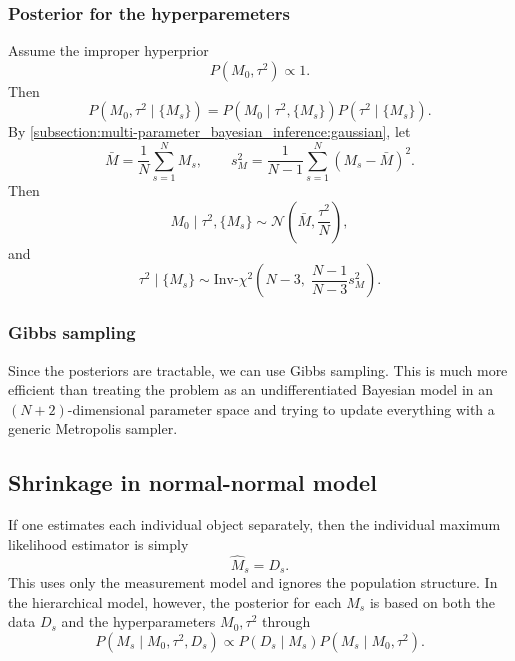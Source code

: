 \documentclass[11pt, titlepage]{article} %
\numberwithin{equation}{section}
\theoremstyle{definition}
\numberwithin{assumption}{section}
\begin{document}
\subsubsection*{Posterior for the hyperparemeters}

Assume the improper hyperprior
\begin{equation*}
    P(M_0,\tau^2)\propto 1.
\end{equation*}
Then
\begin{equation*}
    P(M_0,\tau^2\mid \{M_s\})
    =
    P(M_0\mid \tau^2,\{M_s\})P(\tau^2\mid \{M_s\}).
\end{equation*}
By \cref{subsection:multi-parameter_bayesian_inference:gaussian}, let
\begin{equation*}
    \bar M=\frac{1}{N}\sum_{s=1}^N M_s,
    \qquad
    s_M^2=\frac{1}{N-1}\sum_{s=1}^N (M_s-\bar M)^2.
\end{equation*}
Then
\begin{equation*}
    M_0\mid \tau^2,\{M_s\}
    \sim
    \mathcal{N}\!\left(\bar M,\frac{\tau^2}{N}\right),
\end{equation*}
and
\begin{equation*}
    \tau^2\mid \{M_s\}
    \sim
    \mathrm{Inv}\text{-}\chi^2\!\left(
    N-3,\;
    \frac{N-1}{N-3}s_M^2
    \right).
\end{equation*}

\subsubsection*{Gibbs sampling}

Since the posteriors are tractable, we can use Gibbs sampling. This is much more efficient than treating the problem as an undifferentiated Bayesian model in an $(N+2)$-dimensional parameter space and trying to update everything with a generic Metropolis sampler.



\subsection{Shrinkage in normal-normal model}
If one estimates each individual object separately, then the individual maximum likelihood estimator is simply 
$$\hat M_s=D_s.$$
This uses only the measurement model and ignores the population structure. In the hierarchical model, however, the posterior for each $M_s$ is based on both the data $D_s$ and the hyperparameters $M_0, \tau^2$ through
\begin{equation*}
    P(M_s\mid M_0,\tau^2,D_s)
    \propto
    P(D_s\mid M_s)P(M_s\mid M_0,\tau^2).
\end{equation*}
\end{document}
